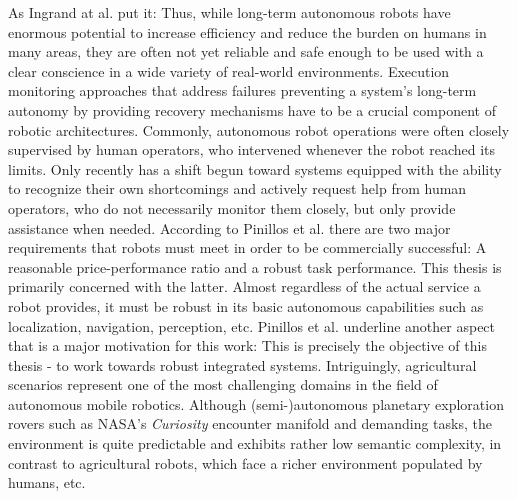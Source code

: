 \documentclass[english, master, utf8]{base/thesis_KBS}
\begin{document}
As Ingrand at al. put it:  \cite{Ingrand:2017}
Thus, while long-term autonomous robots have enormous potential to increase efficiency and reduce the burden on humans in many areas, they are often not yet reliable
and safe enough to be used with a clear conscience in a wide variety of real-world environments. \cite{Arvin:2018} Execution monitoring approaches that address failures preventing
a system's long-term autonomy by providing recovery mechanisms have to be a crucial component of robotic architectures. \cite{Kunze:2018}
Commonly, autonomous robot operations were often closely supervised by human operators, who intervened whenever the robot reached its limits. \cite{Rosenthal:2011}
Only recently has a shift begun toward systems equipped with the ability to recognize their own shortcomings and actively request help from human operators, who do not
necessarily monitor them closely, but only provide assistance when needed. \cite{Rosenthal:2011} According to Pinillos et al. there are two major requirements that robots must meet
in order to be commercially successful: A reasonable price-performance ratio and a robust task performance. \cite{Pinillos:2016} This thesis is primarily concerned with the latter.
Almost regardless of the actual service a robot provides, it must be robust in its basic autonomous capabilities such as localization, navigation, perception, etc. Pinillos et al.
underline another aspect that is a major motivation for this work:  \cite{Pinillos:2016} This is precisely the objective of this thesis - to work towards robust
integrated systems. Intriguingly, agricultural scenarios represent one of the most challenging domains in the field of autonomous mobile robotics. Although (semi-)autonomous
planetary exploration rovers such as NASA's \textit{Curiosity} encounter manifold and demanding tasks, the environment is quite predictable and exhibits
rather low semantic complexity, in contrast to agricultural robots, which face a richer environment populated by humans, etc. \cite{Ingrand:2017}\newline
\end{document}
